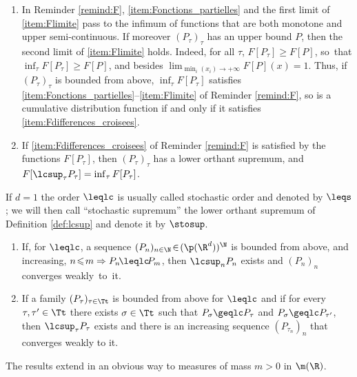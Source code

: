 \skpt
\begin{rem}\label{rem:lcsup}
\begin{enumerate}
\item
\label{p:lcsupa} In Reminder \ref{remind:F}, \eqref{item:Fonctions_partielles} and the first limit of \eqref{item:Flimite} pass to the infimum of functions that are both monotone and upper semi-continuous. If moreover $(P_\tau)_\tau$ has an upper bound $P$, then the second limit of \eqref{item:Flimite} holds. Indeed, for all $\tau$, $F[P_\tau]\geqslant F[P]$, so~that $\inf_\tau F[P_\tau]\geqslant F[P]$, and besides $\lim_{\min_i(x_i)\to+\infty}F[P](x)=1$. Thus, if $(P_\tau)_\tau$ is bounded from above, $\inf_\tau F[P_\tau]$ satisfies \eqref{item:Fonctions_partielles}--\eqref{item:Flimite} of Reminder \ref{remind:F}, so is a cumulative distribution function if and only if it satisfies \eqref{item:Fdifferences_croisees}.
\item
\label{p:lcsupb} If \eqref{item:Fdifferences_croisees} of Reminder \ref{remind:F} is satisfied by the functions $F[P_\tau]$, then $(P_\tau)_\tau$ has a lower orthant supremum, and $F[\lcsup_\tau P_\tau]=\inf_\tau F[P_\tau]$.
\end{enumerate}
\end{rem}

\begin{remnotation}\label{nota:stosup} If $d=1$ the order $\leqlc$ is usually called stochastic order and denoted by $\leqs$; we will then call ``stochastic supremum'' the lower orthant supremum of Definition \ref{def:lcsup} and denote it by $\stosup$.
\end{remnotation}

\skpt
\begin{lem}
\label{lem:sto_order}
\begin{enumerate}
\item
\label{item:suite_croissante_majoree} If, for $\leqlc$, a sequence $(P_n)_{n\in \N}\!\in\!(\p(\R^d))^\N$ is bounded from above, and increasing, \ie $n\!\leqslant\! m\Rightarrow P_{n}\!\leqlc\! P_{m}$, then $\lcsup_nP_n$ exists and $(P_n)_{n}$ converges weakly~to~it.

\item
\label{item:treillis} If a family $(P_\tau)_{\tau\in\Tt}$ is bounded from above for $\leqlc$ and if for every $\tau,\tau'\in \Tt$ there exists $\sigma\in \Tt$ such that $P_\sigma\geqlc P_\tau$ and $P_\sigma\geqlc P_{\tau'}$, then $\lcsup_\tau P_\tau$ exists and there is an increasing sequence $(P_{\tau_n})_n$
that converges weakly to it.
\end{enumerate}
The results extend in an obvious way to measures of mass $m>0$ in $\m(\R)$.
\end{lem}

